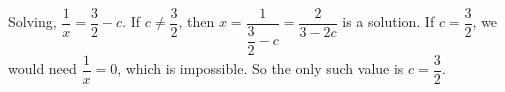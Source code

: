 Solving, $\dfrac{1}{x}=\dfrac{3}{2}-c$. If $c\ne\dfrac{3}{2}$, then $x=\dfrac{1}{\dfrac{3}{2}-c}=\dfrac{2}{3-2c}$ is a solution. If $c=\dfrac{3}{2}$, we would need $\dfrac{1}{x}=0$, which is impossible. So the only such value is $\boxed{c=\dfrac{3}{2}}$.
